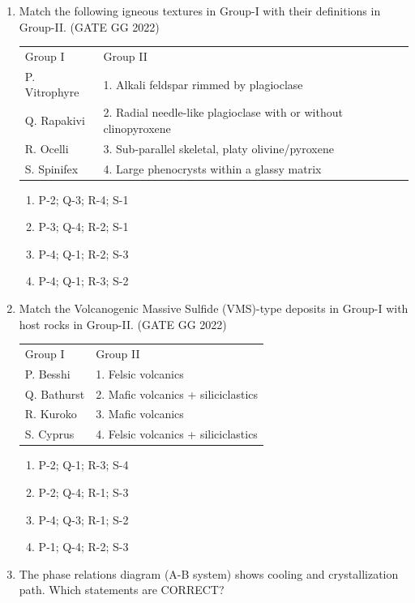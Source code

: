 \documentclass[journal]{IEEEtran}
\begin{document}
\begin{enumerate}[start=1]
\item Match the following igneous textures in Group-I with their definitions in Group-II.  
\hfill(GATE GG 2022)
\begin{tabular}{ l l}
Group I & Group II \\
P. Vitrophyre & 1. Alkali feldspar rimmed by plagioclase \\
Q. Rapakivi & 2. Radial needle-like plagioclase with or without clinopyroxene \\
R. Ocelli & 3. Sub-parallel skeletal, platy olivine/pyroxene \\
S. Spinifex & 4. Large phenocrysts within a glassy matrix \\
\end{tabular}
\begin{enumerate}
\item P-2; Q-3; R-4; S-1  
\item P-3; Q-4; R-2; S-1  
\item P-4; Q-1; R-2; S-3  
\item P-4; Q-1; R-3; S-2 
\end{enumerate}

\item Match the Volcanogenic Massive Sulfide (VMS)-type deposits in Group-I with host rocks in Group-II.  
\hfill(GATE GG 2022)
\begin{tabular}{ l l}
Group I & Group II \\ 
P. Besshi & 1. Felsic volcanics \\
Q. Bathurst & 2. Mafic volcanics + siliciclastics \\
R. Kuroko & 3. Mafic volcanics \\
S. Cyprus & 4. Felsic volcanics + siliciclastics 
\end{tabular}
\begin{enumerate}
\item P-2; Q-1; R-3; S-4  
\item P-2; Q-4; R-1; S-3  
\item P-4; Q-3; R-1; S-2  
\item P-1; Q-4; R-2; S-3  
\end{enumerate}


\item The phase relations diagram (A-B system) shows cooling and crystallization path. Which statements are CORRECT?  


\end{enumerate}
\end{document}
